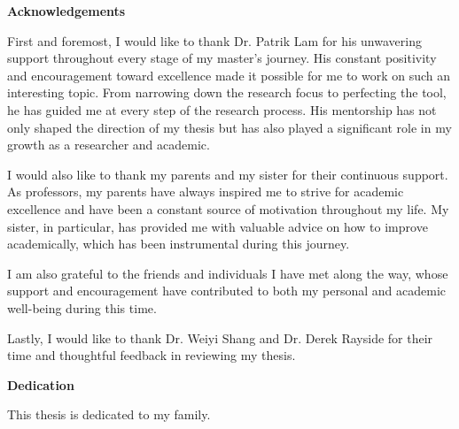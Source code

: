 \cleardoublepage
{}    %

\begin{center}\textbf{Acknowledgements}\end{center}

First and foremost, I would like to thank Dr. Patrik Lam for his unwavering support throughout every stage of my master's journey. His constant positivity and encouragement toward excellence made it possible for me to work on such an interesting topic. From narrowing down the research focus to perfecting the tool, he has guided me at every step of the research process. His mentorship has not only shaped the direction of my thesis but has also played a significant role in my growth as a researcher and academic.

I would also like to thank my parents and my sister for their continuous support. As professors, my parents have always inspired me to strive for academic excellence and have been a constant source of motivation throughout my life. My sister, in particular, has provided me with valuable advice on how to improve academically, which has been instrumental during this journey.

I am also grateful to the friends and individuals I have met along the way, whose support and encouragement have contributed to both my personal and academic well-being during this time.

Lastly, I would like to thank Dr. Weiyi Shang and Dr. Derek Rayside for their time and thoughtful feedback in reviewing my thesis.
\cleardoublepage
{}    %


\begin{center}\textbf{Dedication}\end{center}
This thesis is dedicated to my family.
\cleardoublepage
{}    %



\renewcommand\contentsname{Table of Contents}
\tableofcontents
\cleardoublepage
{}    %

\listoffigures
\cleardoublepage
{}		%

